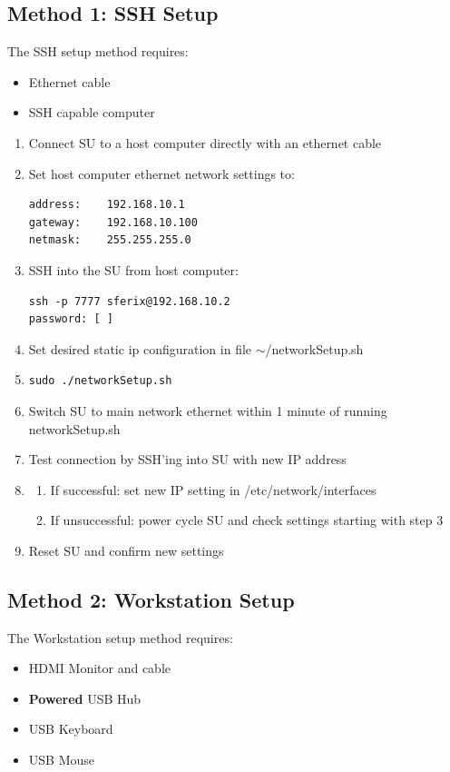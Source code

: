 \subsection*{Method 1: SSH Setup}
The SSH setup method requires:
\begin{itemize}
\item{Ethernet cable}
\item{SSH capable computer}
\end{itemize}

\begin{enumerate}
\item{Connect SU to a host computer directly with an ethernet cable}
\item{Set host computer ethernet network settings to:
\begin{verbatim}
address:	192.168.10.1
gateway:	192.168.10.100
netmask:	255.255.255.0
\end{verbatim}}
\item{SSH into the SU from host computer:
\begin{verbatim}
ssh -p 7777 sferix@192.168.10.2
password: [	]
\end{verbatim}}
\item{Set desired static ip configuration in file $\sim$/networkSetup.sh}
\item{\begin{verbatim}
sudo ./networkSetup.sh
\end{verbatim}}
\item{Switch SU to main network ethernet within 1 minute of running networkSetup.sh}
\item{Test connection by SSH'ing into SU with new IP address}
\item{
\begin{enumerate}
\item{If successful: set new IP setting in /etc/network/interfaces}
\item{If unsuccessful: power cycle SU and check settings starting with step 3}
\end{enumerate}}
\item{Reset SU and confirm new settings}
\end{enumerate}

\subsection*{Method 2: Workstation Setup}
The Workstation setup method requires:
\begin{itemize}
\item{HDMI Monitor and cable}
\item{{\bf Powered} USB Hub}
\item{USB Keyboard}
\item{USB Mouse}
\end{itemize}

